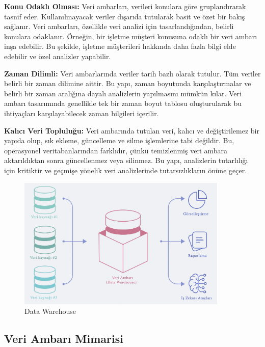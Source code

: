 \documentclass{article}
\begin{document}
\vspace{10pt}
\textbf{Konu Odaklı Olması: }Veri ambarları, verileri konulara göre gruplandırarak tasnif eder. Kullanılmayacak veriler dışarıda tutularak basit ve özet bir bakış sağlanır. Veri ambarları, özellikle veri analizi için tasarlandığından, belirli konulara odaklanır. Örneğin, bir işletme müşteri konusuna odaklı bir veri ambarı inşa edebilir. Bu şekilde, işletme müşterileri hakkında daha fazla bilgi elde edebilir ve özel analizler yapabilir.

\vspace{10pt}
\textbf{Zaman Dilimli: }Veri ambarlarında veriler tarih bazlı olarak tutulur. Tüm veriler belirli bir zaman dilimine aittir. Bu yapı, zaman boyutunda karşılaştırmalar ve belirli bir zaman aralığına dayalı analizlerin yapılmasını mümkün kılar. Veri ambarı tasarımında genellikle tek bir zaman boyut tablosu oluşturularak bu ihtiyaçları karşılayabilecek zaman bilgileri içerilir.


\vspace{10pt}
\textbf{Kalıcı Veri Topluluğu: }Veri ambarında tutulan veri, kalıcı ve değiştirilemez bir yapıda olup, sık ekleme, güncelleme ve silme işlemlerine tabi değildir. Bu, operasyonel veritabanlarından farklıdır, çünkü temizlenmiş veri ambara aktarıldıktan sonra güncellenmez veya silinmez. Bu yapı, analizlerin tutarlılığı için kritiktir ve geçmişe yönelik veri analizlerinde tutarsızlıkların önüne geçer.

 \begin{figure}[h]
\centering
  \includegraphics[width=10cm]{wirehouse.png}
  \caption{Data Warehouse\cite{ref4}}
\end{figure}

\newpage
\subsection{Veri Ambarı Mimarisi}
 
\end{document}
